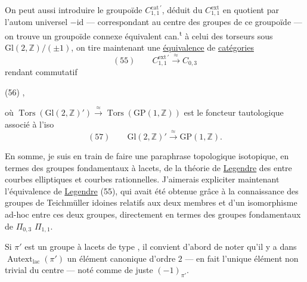 On peut aussi introduire le groupoïde
$C_{1,1}^{\mathrm{cat}\,\prime}$, déduit du 
$C_{1,1}^{\mathrm{ext}}$ en 
quotient par l'autom universel $-\mathrm{id}$
--- correspondant au centre  des groupes
 de ce groupoïde --- on trouve
un groupoïde connexe équivalent can.\textsuperscript{t}
à celui des torseurs sous 
$\mathrm{Gl}(2,\mathbb Z)/(\pm1)$,
 on tire maintenant une
\uline{équivalence} de \uline{catégories}
\[
(55)\qquad C_{1,1}^{\mathrm{ext}\,\prime}\xrightarrow{\approx}C_{0,3}
\]
rendant commutatif

(56)\quad
{},

où $\operatorname{Tors}(\mathrm{Gl}(2,\mathbb Z)')\xrightarrow{\approx}
\operatorname{Tors}(\mathrm{GP}(1,\mathbb Z))$ est
le foncteur tautologique associé à l'iso
\[
(57)\qquad \mathrm{Gl}(2,\mathbb Z)'\xrightarrow{\approx}\mathrm{GP}(1,\mathbb Z).
\]

En somme, je suis en train de faire une
paraphrase topologique isotopique, en termes
des groupes fondamentaux à lacets, de
la théorie de \uline{Legendre} des  entre
courbes elliptiques et courbes rationnelles.
J'aimerais expliciter maintenant l'équivalence
de \uline{Legendre} (55), qui avait
été obtenue grâce à la connaissance des
groupes de Teichmüller idoines relatifs
aux deux membres et d'un isomorphisme
ad-hoc entre ces deux groupes,
directement en termes des groupes
fondamentaux de  $\Pi_{0,3}$  $\Pi_{1,1}$.

Si $\pi'$ est un groupe à lacets de type
, il convient d'abord de noter qu'il
y a dans $\operatorname{Autext}_{\mathrm{lac}}(\pi')$ un élément canonique
d'ordre $2$ --- en fait l'unique élément non trivial
du centre --- noté comme de juste $(-1)_{\pi'}$.


